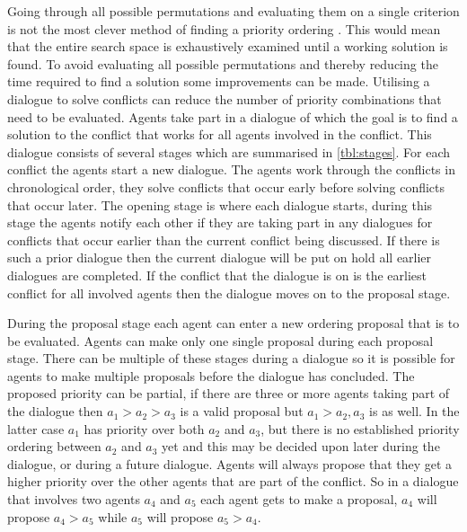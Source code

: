 Going through all possible permutations and evaluating them on a single
criterion is not the most clever method of finding a priority ordering
\cite{bennewitz2002}. This would mean that the entire search space is
exhaustively examined until a working solution is found. To avoid evaluating
all possible permutations and thereby reducing the time required to find a
solution some improvements can be made. Utilising a dialogue to solve conflicts
can reduce the number of priority combinations that need to be evaluated.
Agents take part in a dialogue of which the goal is to find a solution to the
conflict that works for all agents involved in the conflict. This dialogue
consists of several stages which are summarised in \autoref{tbl:stages}. For
each conflict the agents start a new dialogue. The agents work through the
conflicts in chronological order, they solve conflicts that occur early before
solving conflicts that occur later. The opening stage is where each dialogue
starts, during this stage the agents notify each other if they are taking part
in any dialogues for conflicts that occur earlier than the current conflict
being discussed. If there is such a prior dialogue then the current dialogue
will be put on hold all earlier dialogues are completed. If the conflict that
the dialogue is on is the earliest conflict for all involved agents then the
dialogue moves on to the proposal stage.

During the proposal stage each agent can enter a new ordering proposal that is
to be evaluated. Agents can make only one single proposal during each proposal
stage. There can be multiple of these stages during a dialogue so it is
possible for agents to make multiple proposals before the dialogue has
concluded. The proposed priority can be
partial, if there are three or more agents taking part of the dialogue then
$a_1 > a_2 > a_3$ is a valid proposal but $a_1 > a_2, a_3$ is as well. In the
latter case $a_1$ has priority over both $a_2$ and $a_3$, but there is no
established priority ordering between $a_2$ and $a_3$ yet and this may be
decided upon later during the dialogue, or during a future dialogue. Agents
will always propose that they get a higher priority over the other agents that
are part of the conflict. So in a dialogue that involves two agents $a_4$ and
$a_5$ each agent gets to make a proposal, $a_4$ will propose $a_4 > a_5$ while
$a_5$ will propose $a_5 > a_4$.

